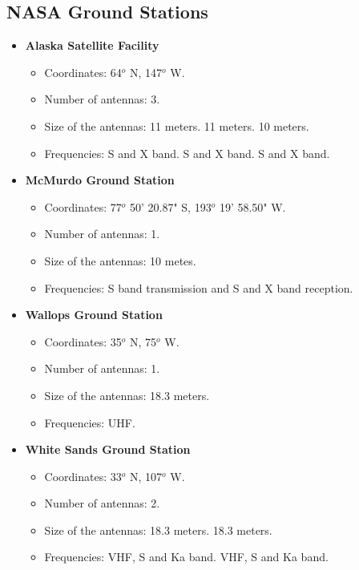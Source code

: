 \subsection{NASA Ground Stations}
\begin{itemize}
\item \textbf{Alaska Satellite Facility}
\begin{itemize}
\item Coordinates: 64$^{o}$ N, 147$^{o}$ W.
\item Number of antennas: 3.
\item Size of the antennas: 11 meters. 11 meters. 10 meters.
\item Frequencies: S and X band. S and X band. S and X band.
\end{itemize}
\item \textbf{McMurdo Ground Station}
\begin{itemize}
\item Coordinates: 77$^{o}$ 50' 20.87" S, 193$^{o}$ 19' 58.50" W.
\item Number of antennas: 1.
\item Size of the antennas: 10 metes.
\item Frequencies: S band transmission and S and X band reception.
\end{itemize}
\item \textbf{Wallops Ground Station}
\begin{itemize}
\item Coordinates: 35$^{o}$ N, 75$^{o}$ W.
\item Number of antennas: 1.
\item Size of the antennas: 18.3 meters.
\item Frequencies: UHF.
\end{itemize}
\item \textbf{White Sands Ground Station}
\begin{itemize}
\item Coordinates: 33$^{o}$ N, 107$^{o}$ W.
\item Number of antennas: 2.
\item Size of the antennas: 18.3 meters. 18.3 meters.
\item Frequencies: VHF, S and Ka band. VHF, S and Ka band.
\end{itemize}
\end{itemize}

